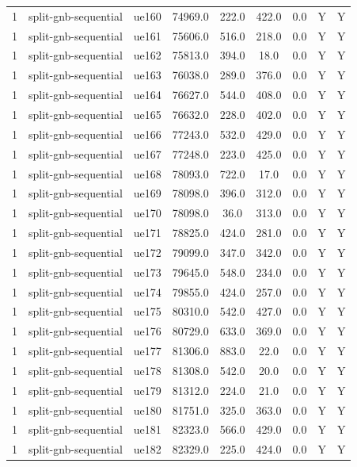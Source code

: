 \begin{table}[ht]
\begin{tabular}{|c|c|c|c|c|c|c|c|c|}
1 & split-gnb-sequential & ue160 & 74969.0 & 222.0 & 422.0 & 0.0 & Y & Y \\
1 & split-gnb-sequential & ue161 & 75606.0 & 516.0 & 218.0 & 0.0 & Y & Y \\
1 & split-gnb-sequential & ue162 & 75813.0 & 394.0 & 18.0 & 0.0 & Y & Y \\
1 & split-gnb-sequential & ue163 & 76038.0 & 289.0 & 376.0 & 0.0 & Y & Y \\
1 & split-gnb-sequential & ue164 & 76627.0 & 544.0 & 408.0 & 0.0 & Y & Y \\
1 & split-gnb-sequential & ue165 & 76632.0 & 228.0 & 402.0 & 0.0 & Y & Y \\
1 & split-gnb-sequential & ue166 & 77243.0 & 532.0 & 429.0 & 0.0 & Y & Y \\
1 & split-gnb-sequential & ue167 & 77248.0 & 223.0 & 425.0 & 0.0 & Y & Y \\
1 & split-gnb-sequential & ue168 & 78093.0 & 722.0 & 17.0 & 0.0 & Y & Y \\
1 & split-gnb-sequential & ue169 & 78098.0 & 396.0 & 312.0 & 0.0 & Y & Y \\
1 & split-gnb-sequential & ue170 & 78098.0 & 36.0 & 313.0 & 0.0 & Y & Y \\
1 & split-gnb-sequential & ue171 & 78825.0 & 424.0 & 281.0 & 0.0 & Y & Y \\
1 & split-gnb-sequential & ue172 & 79099.0 & 347.0 & 342.0 & 0.0 & Y & Y \\
1 & split-gnb-sequential & ue173 & 79645.0 & 548.0 & 234.0 & 0.0 & Y & Y \\
1 & split-gnb-sequential & ue174 & 79855.0 & 424.0 & 257.0 & 0.0 & Y & Y \\
1 & split-gnb-sequential & ue175 & 80310.0 & 542.0 & 427.0 & 0.0 & Y & Y \\
1 & split-gnb-sequential & ue176 & 80729.0 & 633.0 & 369.0 & 0.0 & Y & Y \\
1 & split-gnb-sequential & ue177 & 81306.0 & 883.0 & 22.0 & 0.0 & Y & Y \\
1 & split-gnb-sequential & ue178 & 81308.0 & 542.0 & 20.0 & 0.0 & Y & Y \\
1 & split-gnb-sequential & ue179 & 81312.0 & 224.0 & 21.0 & 0.0 & Y & Y \\
1 & split-gnb-sequential & ue180 & 81751.0 & 325.0 & 363.0 & 0.0 & Y & Y \\
1 & split-gnb-sequential & ue181 & 82323.0 & 566.0 & 429.0 & 0.0 & Y & Y \\
1 & split-gnb-sequential & ue182 & 82329.0 & 225.0 & 424.0 & 0.0 & Y & Y \\

\end{tabular}
\end{table}
